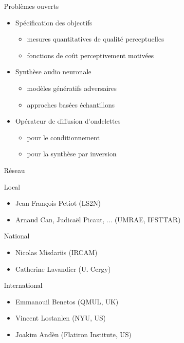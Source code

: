 \begin{frame}{Problèmes ouverts}
\begin{itemize}
  \item Spécification des objectifs
  \begin{itemize}
  \item mesures quantitatives de qualité perceptuelles
  \item fonctions de coût perceptivement motivées
  \end{itemize}
\item Synthèse audio neuronale
\begin{itemize}
  \item modèles génératifs adversaires
\item approches basées échantillons
\end{itemize}
\item Opérateur de diffusion d'ondelettes
\begin{itemize}
\item pour le conditionnement
\item pour la synthèse par inversion
\end{itemize}
\end{itemize}
\end{frame}

%


\begin{frame}{Réseau}
\begin{block}{Local}
\begin{itemize}
\item Jean-François Petiot (LS2N)
\item Arnaud Can, Judicaël Picaut, ... (UMRAE, IFSTTAR)
\end{itemize}
\end{block}
\begin{block}{National}
\begin{itemize}
\item Nicolas Misdariis (IRCAM)
\item Catherine Lavandier (U. Cergy)
\end{itemize}
\end{block}
\begin{block}{International}
\begin{itemize}
\item Emmanouil Benetos (QMUL, UK)
\item Vincent Lostanlen (NYU, US)
\item Joakim Andèn (Flatiron Institute, US)
\end{itemize}
\end{block}
\end{frame}

